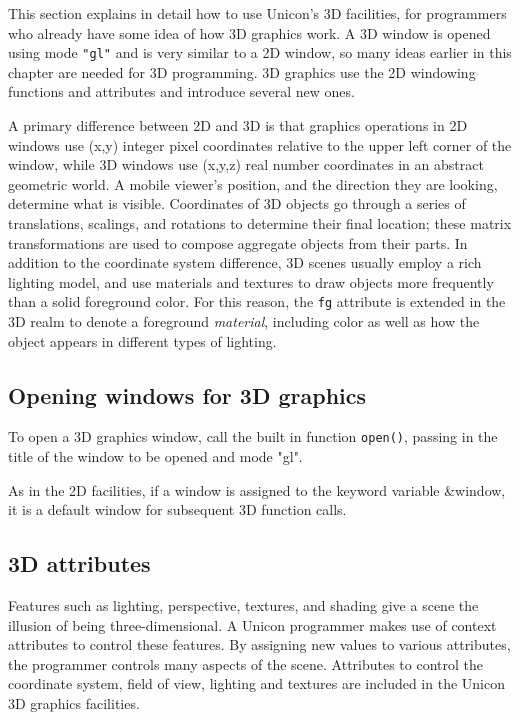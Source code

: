 This section explains in detail how to use Unicon's 3D facilities, for
programmers who already have some idea of how 3D graphics work. A 3D
window is opened using mode \texttt{"gl"} and is very similar to a 2D
window, so many ideas earlier in this chapter are needed for 3D
programming. 3D graphics use the 2D windowing functions and attributes
and introduce several new ones.

A primary difference between 2D and 3D is that graphics operations in
2D windows use (x,y) integer pixel coordinates relative to the upper
left corner of the window, while 3D windows use (x,y,z) real number
coordinates in an abstract geometric world. A mobile viewer's
position, and the direction they are looking, determine what is
visible. Coordinates of 3D objects go through a series of
translations, scalings, and rotations to determine their final
location; these matrix transformations are used to compose aggregate
objects from their parts. In addition to the coordinate system
difference, 3D scenes usually employ a rich lighting model, and use
materials and textures to draw objects more frequently than a solid
foreground color. For this reason, the \texttt{fg} attribute is
extended in the 3D realm to denote a foreground \textit{material},
including color as well as how the object appears in different types
of lighting.

\subsection*{Opening windows for 3D graphics}

To open a 3D graphics window, call the built in function \texttt{open()},
passing in the title of the window to be opened and mode "gl".


\noindent
As in the 2D facilities, if a window is assigned to the keyword variable
\&window, it is a default window for subsequent 3D function calls. 

\subsection*{3D attributes}

Features such as lighting, perspective, textures, and shading give a
scene the illusion of being three-dimensional. A Unicon programmer
makes use of context attributes to control these features. By
assigning new values to various attributes, the programmer controls
many aspects of the scene. Attributes to control the coordinate
system, field of view, lighting and textures are included in the
Unicon 3D graphics facilities.

